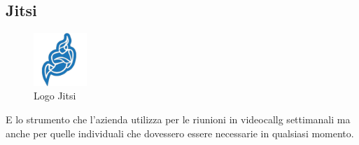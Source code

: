\subsection*{Jitsi}
\begin{figure}[H]
  \centering
  \includegraphics[width=2cm]{immagini/logo-Jitsi.jpg}
  \caption{Logo Jitsi}
\end{figure}
E lo strumento che l'azienda utilizza per le riunioni in \gls{videocallg} settimanali ma anche per quelle individuali che dovessero essere necessarie
in qualsiasi momento.

